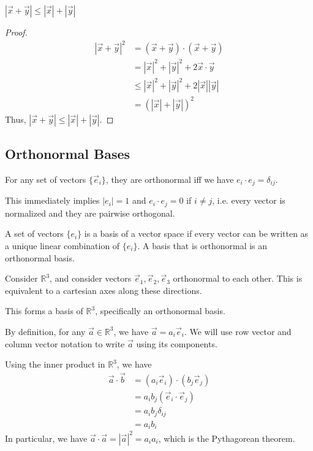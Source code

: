 \documentclass[12pt]{article}
\begin{document}
\begin{theorem}
    $|\vec{x} + \vec{y}| \le |\vec{x}| + |\vec{y}|$
\end{theorem}
\begin{proof}
    \begin{align*}
        |\vec{x}+\vec{y}|^{2} &= (\vec{x} + \vec{y})\cdot(\vec{x} + \vec{y})\\
                              &= |\vec{x}|^{2} + |\vec{y}|^{2} + 2\vec{x}\cdot\vec{y}\\
                              &\le |\vec{x}|^{2}+|\vec{y}|^{2}+2|\vec{x}||\vec{y}|\\
                              &= (|\vec{x}| + |\vec{y}|)^{2}
    \end{align*}
    Thus, $|\vec{x}+\vec{y}| \le |\vec{x}| + |\vec{y}|$.
\end{proof}

\subsection{Orthonormal Bases}

\begin{definition}
    For any set of vectors $\{\vec{e}_i\}$, they are orthonormal iff
    we have $e_i \cdot e_j = \delta _{ij}$. 
\end{definition}
This immediately implies $|e_i| = 1$ and $e_i \cdot e_j = 0$ if $i \ne j$,
i.e. every vector is normalized and they are pairwise orthogonal.

\begin{definition}
    A set of vectors $\{e_i\}$ is a basis of a vector space
    if every vector can be written as a unique linear combination of $\{e_i\}$.
    A basis that is orthonormal is an orthonormal basis.
\end{definition}

Consider $\mathbb{R}^{3}$, and consider vectors $\vec{e}_1, \vec{e}_2, \vec{e}_3$ 
orthonormal to each other. 
This is equivalent to a cartesian axes along these directions.

This forms a basis of $\mathbb{R}^{3}$, specifically an orthonormal basis.

By definition, for any $\vec{a} \in \mathbb{R}^{3}$, we have $\vec{a} = a_i \vec{e}_i$.
We will use row vector and 
column vector notation to write $\vec{a}$ using its components.

Using the inner product in $\mathbb{R}^{3}$, we have
\begin{align*}
    \vec{a}\cdot\vec{b} &= (a_i \vec{e}_i) \cdot (b_j \vec{e}_j)\\
                    &= a_i b_j (\vec{e}_i \cdot \vec{e}_j)\\
                    &= a_i b_j \delta _{ij}\\
                    &= a_i b_i
\end{align*}
In particular, we have $\vec{a}\cdot\vec{a} = |\vec{a}|^{2} = a_i a_i$, 
which is the Pythagorean theorem.
\end{document}
